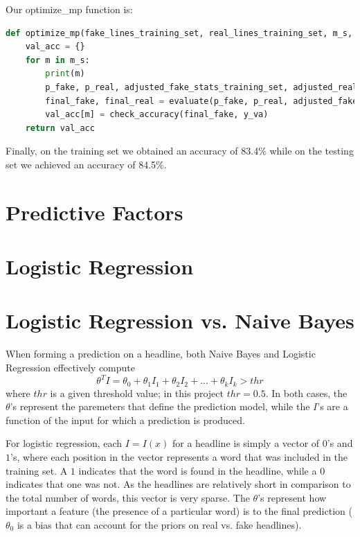 \documentclass{article}
\begin{document}
Our optimize\_mp function is:
\begin{lstlisting}[language=Python]
def optimize_mp(fake_lines_training_set, real_lines_training_set, m_s, mp):
    val_acc = {}
    for m in m_s:
        print(m)
        p_fake, p_real, adjusted_fake_stats_training_set, adjusted_real_stats_training_set = training_part(fake_lines_training_set, real_lines_training_set, m, mp)
        final_fake, final_real = evaluate(p_fake, p_real, adjusted_fake_stats_training_set, adjusted_real_stats_training_set, validation_set)
        val_acc[m] = check_accuracy(final_fake, y_va)
    return val_acc

  \end{lstlisting}

Finally, on the training set we obtained an accuracy of 83.4\% while on the testing set we achieved an accuracy of 84.5\%.

   \section{Predictive Factors}




   \section{Logistic Regression}



   \section{Logistic Regression vs. Naive Bayes}
   When forming a prediction on a headline, both Naive Bayes and Logistic Regression effectively compute
   \begin{equation*}
      \theta^T I = \theta_0 + \theta_1 I_1 + \theta_2 I_2 + ... + \theta_k I_k > thr
   \end{equation*}
   where $thr$ is a given threshold value; in this project $thr = 0.5$. In both cases, the $\theta$'s represent
   the paremeters that define the prediction model, while the $I$'s are a function of the input for which a
   prediction is produced.

   For logistic regression, each $I = I(x)$ for a headline is simply a vector of $0$'s and $1$'s, where each
   position in the vector represents a word that was included in the training set. A $1$ indicates that the
   word is found in the headline, while a $0$ indicates that one was not. As the headlines are relatively short
   in comparison to the total number of words, this vector is very sparse. The $\theta$'s represent how important
   a feature (the presence of a particular word) is to the final prediction ($\theta_0$ is a bias that can
   account for the priors on real vs. fake headlines).
\end{document}
